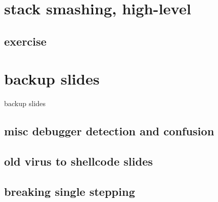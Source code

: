 \section{stack smashing, high-level}


\subsection{exercise}

\section{backup slides}
\begin{frame}{backup slides}
\end{frame}


\subsection{misc debugger detection and confusion}


\subsection{old virus to shellcode slides}


\subsection{breaking single stepping}



